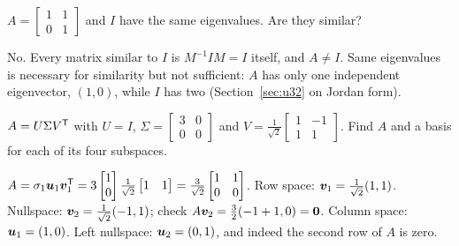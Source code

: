\begin{exercise}\label{exr:u37-notsimilar}
$A=\begin{bmatrix}1&1\\0&1\end{bmatrix}$ and $I$ have the same eigenvalues. Are they similar?
\end{exercise}
\begin{solution}
No. Every matrix similar to $I$ is $M^{-1}IM=I$ itself, and $A\neq I$. Same eigenvalues is necessary for similarity but not sufficient: $A$ has only one independent eigenvector, $(1,0)$, while $I$ has two (Section~\ref{sec:u32} on Jordan form).
\end{solution}

\begin{exercise}\label{exr:u37-pieces}
$A=U\Sigma V^{\mathsf{T}}$ with $U=I$, $\Sigma=\begin{bmatrix}3&0\\0&0\end{bmatrix}$ and $V=\frac{1}{\sqrt2}\begin{bmatrix}1&-1\\1&1\end{bmatrix}$. Find $A$ and a basis for each of its four subspaces.
\end{exercise}
\begin{solution}
$A=\sigma_1\boldsymbol{u}_1\boldsymbol{v}_1^{\mathsf{T}}=3\begin{bmatrix}1\\0\end{bmatrix}\frac{1}{\sqrt2}\begin{bmatrix}1&1\end{bmatrix}=\frac{3}{\sqrt2}\begin{bmatrix}1&1\\0&0\end{bmatrix}$. Row space: $\boldsymbol{v}_1=\tfrac{1}{\sqrt2}(1,1)$. Nullspace: $\boldsymbol{v}_2=\tfrac{1}{\sqrt2}(-1,1)$; check $A\boldsymbol{v}_2=\tfrac{3}{2}(-1+1,0)=\boldsymbol{0}$. Column space: $\boldsymbol{u}_1=(1,0)$. Left nullspace: $\boldsymbol{u}_2=(0,1)$, and indeed the second row of $A$ is zero.
\end{solution}
